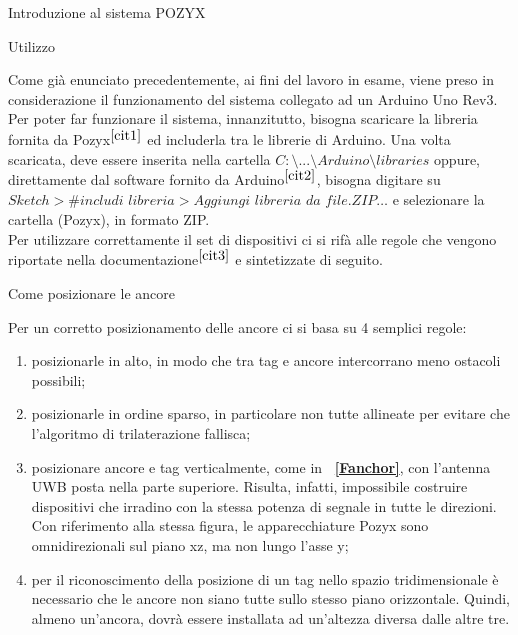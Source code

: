 \documentclass[12pt]{report}
\begin{document}
\begin{section}{Introduzione al sistema POZYX}
	\begin{subsection}{Utilizzo}
		
		Come già enunciato precedentemente, ai fini del lavoro in esame, viene preso in considerazione il funzionamento del sistema collegato ad un Arduino Uno Rev3. Per poter far funzionare il sistema, innanzitutto, bisogna scaricare la libreria fornita da Pozyx$^{{\cite{cit1}}}$ ed includerla tra le librerie di Arduino. 				Una volta scaricata, deve essere inserita nella cartella $C:\setminus...\setminus Arduino\setminus libraries$ oppure, direttamente dal software fornito da Arduino$^{{\cite{cit2}}}$, bisogna digitare su $Sketch>\#includi$ $libreria>Aggiungi$ $libreria$ $da$ $file .ZIP…$ e selezionare la cartella (Pozyx), in formato 			ZIP.\\
		Per utilizzare	correttamente il set di dispositivi ci si rifà alle regole che vengono riportate nella documentazione$^{{\cite{cit3}}}$ e sintetizzate di seguito.

	\end{subsection}

	\begin{subsection}{Come posizionare le ancore}

		Per un corretto posizionamento delle ancore ci si basa su 4 semplici regole:

		\begin{enumerate}
				\item posizionarle in alto, in modo che tra tag e ancore intercorrano meno ostacoli possibili;
				\item posizionarle in ordine sparso, in particolare non tutte allineate per evitare che l’algoritmo di trilaterazione fallisca;
				\item posizionare ancore e tag verticalmente, come in \textbf{\figurename~\ref{Fanchor}}, con l'antenna UWB posta nella parte superiore. Risulta, infatti, impossibile costruire dispositivi che irradino con la stessa potenza di segnale in tutte le direzioni. Con riferimento alla stessa figura, le apparecchiature 									 Pozyx sono omnidirezionali sul piano xz, ma non lungo l’asse y;
				\item per il riconoscimento della posizione di un tag nello spazio tridimensionale è necessario che le ancore non siano tutte sullo stesso piano orizzontale. Quindi, almeno un'ancora, dovrà essere installata ad un'altezza diversa dalle altre tre.
		\end{enumerate}


\end{subsection}
\end{section}
\end{document}
